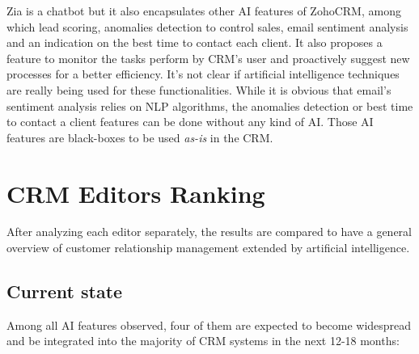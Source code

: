 Zia is a chatbot but it also encapsulates other AI features of ZohoCRM, among which lead scoring, anomalies detection to control sales, email sentiment analysis and an indication on the best time to contact each client. It also proposes a feature to monitor the tasks perform by CRM's user and proactively suggest new processes for a better efficiency. It's not clear if artificial intelligence techniques are really being used for these functionalities. While it is obvious that email's sentiment analysis relies on NLP algorithms, the anomalies detection or best time to contact a client features can be done without any kind of AI. Those AI features are black-boxes to be used \textit{as-is} in the CRM.


\section{CRM Editors Ranking}
After analyzing each editor separately, the results are compared to have a general overview of customer relationship management extended by artificial intelligence.

\subsection{Current state}
Among all AI features observed, four of them are expected to become widespread and be integrated into the majority of CRM systems in the next 12-18 months:


